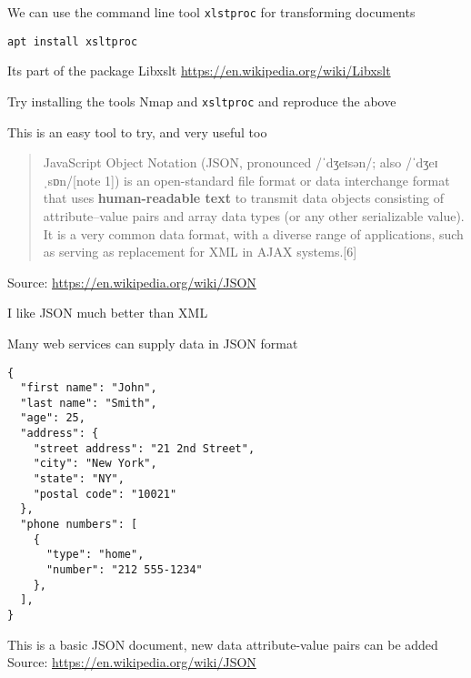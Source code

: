\documentclass[Screen16to9,17pt]{foils}
\begin{document}
\begin{list2}
\item We can use the command line tool \verb+xlstproc+ for transforming documents
\item \verb+apt install xsltproc+
\item Its part of the package Libxslt \url{https://en.wikipedia.org/wiki/Libxslt}
\vskip 2cm
\item Try installing the tools Nmap and \verb+xsltproc+ and reproduce the above
\item This is an easy tool to try, and very useful too
\end{list2}






\begin{quote}
JavaScript Object Notation (JSON, pronounced /ˈdʒeɪsən/; also /ˈdʒeɪˌsɒn/[note 1]) is an open-standard file format or data interchange format that uses {\bf human-readable text} to transmit data objects consisting of attribute–value pairs and array data types (or any other serializable value). It is a very common data format, with a diverse range of applications, such as serving as replacement for XML in AJAX systems.[6]
\end{quote}
Source: \url{https://en.wikipedia.org/wiki/JSON}

\begin{list2}
\item I like JSON much better than XML
\item Many web services can supply data in JSON format
\end{list2}


\begin{verbatim}
{
  "first name": "John",
  "last name": "Smith",
  "age": 25,
  "address": {
    "street address": "21 2nd Street",
    "city": "New York",
    "state": "NY",
    "postal code": "10021"
  },
  "phone numbers": [
    {
      "type": "home",
      "number": "212 555-1234"
    },
  ],
}
\end{verbatim}

\begin{list2}
\item This is a basic JSON document, new data attribute-value pairs can be added\\
Source: \url{https://en.wikipedia.org/wiki/JSON}
\end{list2}
\end{document}
